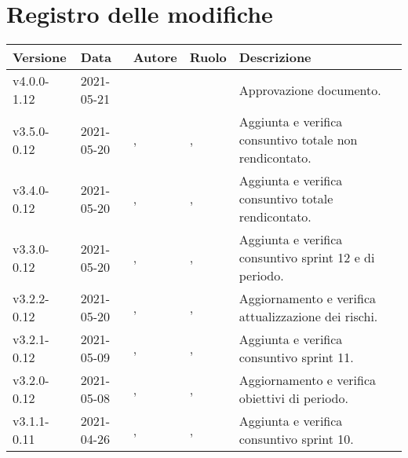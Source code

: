 \section*{\hfil Registro delle modifiche \hfil}
{
	\newlength{\freewidth}
	\setlength{\freewidth}{\dimexpr\textwidth-10\tabcolsep}
	\renewcommand{\arraystretch}{1.5}
	\centering
	\setlength{\aboverulesep}{0pt}
	\setlength{\belowrulesep}{0pt}
	\begin{longtable}{C{.131777\freewidth} C{.134036\freewidth} C{.263554\freewidth} C{.188254\freewidth} C{.282379\freewidth}}
		\toprule 
		\textbf{Versione} & \textbf{Data} & \textbf{Autore} & \textbf{Ruolo} & \textbf{Descrizione}\\
		\toprule
		\endhead
		v4.0.0-1.12 & 2021-05-21 & \Davide{} & \RdP{} & Approvazione documento. \\
		v3.5.0-0.12 & 2021-05-20 & \Tommaso{}, \newline{} \Lucrezia{} & \ver{}, \newline{} \progr{} & Aggiunta e verifica consuntivo totale non rendicontato. \\
		v3.4.0-0.12 & 2021-05-20 & \Matteo{}, \newline{} \Daniele{} & \ver{}, \newline{} \progr{} & Aggiunta e verifica consuntivo totale rendicontato. \\
		v3.3.0-0.12 & 2021-05-20 & \Matteo{}, \newline{} \Daniele{} & \ver{}, \newline{} \progr{} & Aggiunta e verifica consuntivo sprint 12 e di periodo. \\
		v3.2.2-0.12 & 2021-05-20 & \Tommaso{}, \newline{} \Lucrezia{} & \ver{}, \newline{} \progr{} & Aggiornamento e verifica attualizzazione dei rischi. \\
		v3.2.1-0.12 & 2021-05-09 & \Tommaso{}, \newline{} \Lucrezia{} & \ver{}, \newline{} \progr{} & Aggiunta e verifica consuntivo sprint 11. \\
		v3.2.0-0.12 & 2021-05-08 & \Francesco{}, \newline{} \Daniele{} & \ver{}, \newline{} \progr{} & Aggiornamento e verifica obiettivi di periodo. \\
		v3.1.1-0.11 & 2021-04-26 & \Matteo{}, \newline{} \Daniele{} & \ver{}, \newline{} \progr{} & Aggiunta e verifica consuntivo sprint 10. \\

\end{longtable}}
